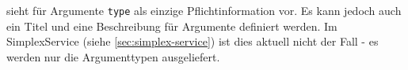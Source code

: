 

 sieht für Argumente \texttt{type} als einzige Pflichtinformation vor\rfgfrjfn. Es
kann jedoch auch ein Titel und eine Beschreibung für Argumente definiert werden.
 Im SimplexService (siehe \ref{sec:simplex-service}) ist dies aktuell
nicht der Fall - es werden nur die Argumenttypen ausgeliefert.
